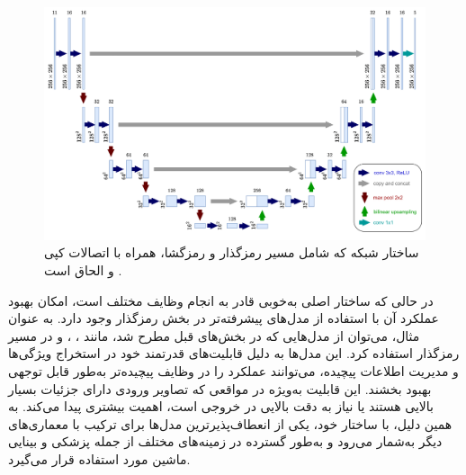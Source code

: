 \begin{figure}[h]
    \centering
    \includegraphics[width=1\textwidth]{Images/Chapter2/U-Net.drawio.png}
    \caption{ساختار شبکه  که شامل مسیر رمزگذار و رمزگشا، همراه با اتصالات کپی و الحاق است
    \cite{ronneberger2015u}.}
    \label{fig:unet_architecture}
\end{figure}

در حالی که ساختار اصلی  به‌خوبی قادر به انجام وظایف مختلف است، امکان بهبود عملکرد آن با استفاده از مدل‌های پیشرفته‌تر در بخش رمزگذار وجود دارد. به عنوان مثال، می‌توان از مدل‌هایی که در بخش‌های قبل مطرح شد،‌ مانند
 ، ،  و 
  در مسیر رمزگذار
   استفاده کرد. این مدل‌ها به دلیل قابلیت‌های قدرتمند خود در استخراج ویژگی‌ها و مدیریت اطلاعات پیچیده، می‌توانند عملکرد
    را در وظایف پیچیده‌تر به‌طور قابل توجهی بهبود بخشند. 
این قابلیت به‌ویژه در مواقعی که تصاویر ورودی دارای جزئیات بسیار بالایی هستند یا نیاز به دقت بالایی در خروجی است، اهمیت بیشتری پیدا می‌کند. به همین دلیل،  با ساختار خود، یکی از انعطاف‌پذیرترین مدل‌ها برای ترکیب با معماری‌های دیگر به‌شمار می‌رود و به‌طور گسترده در زمینه‌های مختلف از جمله پزشکی و بینایی ماشین مورد استفاده قرار می‌گیرد.





